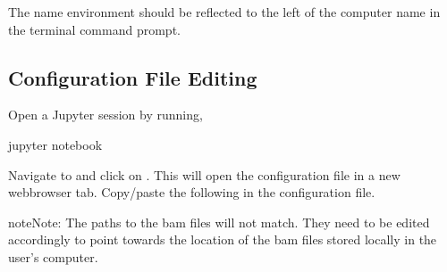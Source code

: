 \documentclass[letterpaper,10pt,english]{sphinxhowto}
\begin{document}
\sphinxAtStartPar
The name  environment should be reflected to the left of the computer name in the terminal command prompt.


\subsection{Configuration File Editing}
\label{\detokenize{index:configuration-file-editing}}
\sphinxAtStartPar
Open a Jupyter session by running,

\begin{sphinxVerbatim}[commandchars=\\\{\}]
\PYGZdl{} jupyter notebook
\end{sphinxVerbatim}

\sphinxAtStartPar
Navigate to  and click on . This will open the configuration file in a new web\sphinxhyphen{}browser tab. Copy/paste the following in the configuration file.

\begin{sphinxadmonition}{note}{Note:}
\sphinxAtStartPar
The paths to the bam files will not match. They need to be edited accordingly to point towards the location of the bam files stored locally in the user’s computer.
\end{sphinxadmonition}
\end{document}
